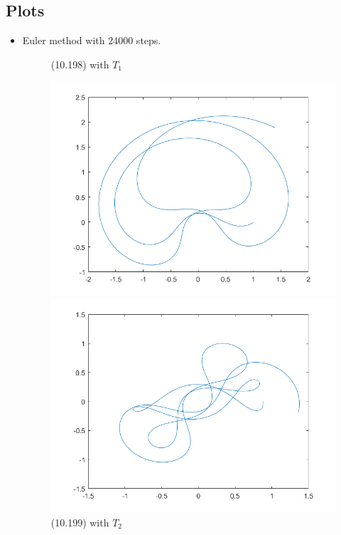 \documentclass[a4paper,11.5pt,UTF8]{ctexart}
\begin{document}
\begin{large}
\section{Plots}
\begin{itemize}
    \item Euler method with 24000 steps.
    \begin{figure}[H]
        \centering
            \begin{minipage}{0.48\textwidth}
    	    \centering
    	    \caption{(10.198) with $T_1$}
    	    \includegraphics[scale=0.48]{./image/Euler_1.png}
    	    \end{minipage}
            \begin{minipage}{0.48\textwidth}
    	    \centering
    	    \caption{(10.199) with $T_2$}
    	    \includegraphics[scale=0.48]{./image/Euler_2.png}

\end{minipage}
\end{figure}
\end{itemize}
\end{large}
\end{document}
